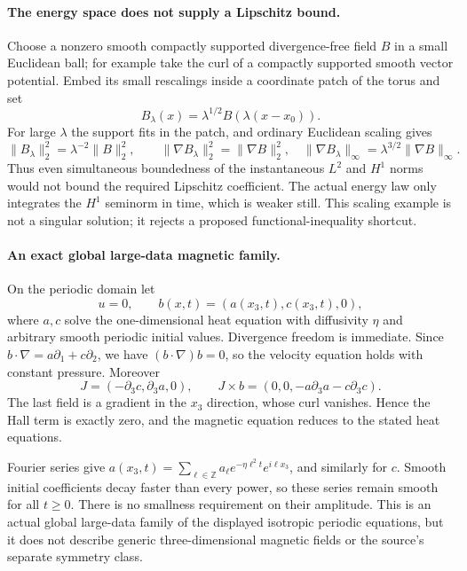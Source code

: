 \documentclass[11pt]{article}
\begin{document}
\paragraph{The energy space does not supply a Lipschitz bound.}
Choose a nonzero smooth compactly supported divergence-free field
$B$ in a small Euclidean ball; for example take the curl of a
compactly supported smooth vector potential. Embed its small rescalings
inside a coordinate patch of the torus and set
\[
 B_\lambda(x)=\lambda^{1/2}B(\lambda(x-x_0)).
\]
For large $\lambda$ the support fits in the patch, and ordinary
Euclidean scaling gives
\[
 \|B_\lambda\|_2^2=\lambda^{-2}\|B\|_2^2,\qquad
 \|\nabla B_\lambda\|_2^2=\|\nabla B\|_2^2,
 \quad
 \|\nabla B_\lambda\|_\infty
      =\lambda^{3/2}\|\nabla B\|_\infty.
 \tag{392.8}
\]
Thus even simultaneous boundedness of the instantaneous $L^2$
and $H^1$ norms would not bound the required Lipschitz coefficient.
The actual energy law only integrates the $H^1$ seminorm in time,
which is weaker still. This scaling example is not a singular
solution; it rejects a proposed functional-inequality shortcut.

\paragraph{An exact global large-data magnetic family.}
On the periodic domain let
\[
 u=0,\qquad b(x,t)=(a(x_3,t),c(x_3,t),0),
\]
where $a,c$ solve the one-dimensional heat equation with diffusivity
$\eta$ and arbitrary smooth periodic initial values. Divergence
freedom is immediate. Since $b\cdot\nabla=a\partial_1+c\partial_2$,
we have $(b\cdot\nabla)b=0$, so the velocity equation holds with
constant pressure. Moreover
\[
 J=(-\partial_3c,\partial_3a,0),\qquad
 J\times b=(0,0,-a\partial_3a-c\partial_3c).
\]
The last field is a gradient in the $x_3$ direction, whose curl
vanishes. Hence the Hall term is exactly zero, and the magnetic
equation reduces to the stated heat equations.

Fourier series give
$a(x_3,t)=\sum_{\ell\in\mathbb Z}a_\ell e^{-\eta\ell^2t}e^{i\ell x_3}$,
and similarly for $c$. Smooth initial coefficients decay faster
than every power, so these series remain smooth for all $t\geq0$.
There is no smallness requirement on their amplitude. This is an
actual global large-data family of the displayed isotropic periodic
equations, but it does not describe generic three-dimensional
magnetic fields or the source's separate symmetry class.
\end{document}
